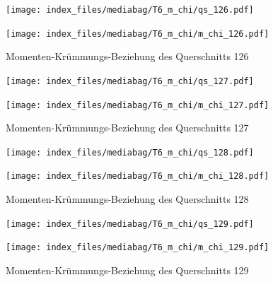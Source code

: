 \documentclass[
  11pt,
  letterpaper,
]{scrreprt}
\begin{document}
\begin{figure}[H]

\begin{minipage}{0.50\linewidth}
\texttt{[image: index\_files/mediabag/T6\_m\_chi/qs\_126.pdf]}\end{minipage}%
%
\begin{minipage}{0.50\linewidth}
\texttt{[image: index\_files/mediabag/T6\_m\_chi/m\_chi\_126.pdf]}\end{minipage}%

\caption{\label{fig-mchi_anhang}Momenten-Krümmungs-Beziehung des
Querschnitts 126}

\end{figure}%

\begin{figure}[H]

\begin{minipage}{0.50\linewidth}
\texttt{[image: index\_files/mediabag/T6\_m\_chi/qs\_127.pdf]}\end{minipage}%
%
\begin{minipage}{0.50\linewidth}
\texttt{[image: index\_files/mediabag/T6\_m\_chi/m\_chi\_127.pdf]}\end{minipage}%

\caption{\label{fig-mchi_anhang}Momenten-Krümmungs-Beziehung des
Querschnitts 127}

\end{figure}%

\begin{figure}[H]

\begin{minipage}{0.50\linewidth}
\texttt{[image: index\_files/mediabag/T6\_m\_chi/qs\_128.pdf]}\end{minipage}%
%
\begin{minipage}{0.50\linewidth}
\texttt{[image: index\_files/mediabag/T6\_m\_chi/m\_chi\_128.pdf]}\end{minipage}%

\caption{\label{fig-mchi_anhang}Momenten-Krümmungs-Beziehung des
Querschnitts 128}

\end{figure}%

\begin{figure}[H]

\begin{minipage}{0.50\linewidth}
\texttt{[image: index\_files/mediabag/T6\_m\_chi/qs\_129.pdf]}\end{minipage}%
%
\begin{minipage}{0.50\linewidth}
\texttt{[image: index\_files/mediabag/T6\_m\_chi/m\_chi\_129.pdf]}\end{minipage}%

\caption{\label{fig-mchi_anhang}Momenten-Krümmungs-Beziehung des
Querschnitts 129}

\end{figure}%
\end{document}
